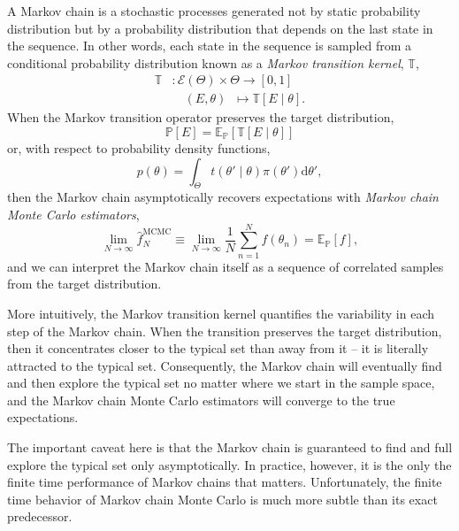 \documentclass[11pt, oneside]{article}
\newcommand{\dd}{ \mathrm{d} }
\newcommand{\PP}{ \mathbb{P} }
\newcommand{\EV}[1]{\ensuremath { \mathcal{E} \! \left( #1 \right)  } }
\begin{document}
A Markov chain is a stochastic processes generated not by 
static probability distribution but by a probability distribution 
that depends on the last state in the sequence.  In other words, 
each state in the sequence is sampled from a conditional 
probability distribution known as a \emph{Markov transition 
kernel}, $\mathbb{T}$, 
%
\begin{align*}
\mathbb{T}
&: \EV{\Theta} \times \Theta \rightarrow \left[0, 1 \right] \\
&\quad \left( E, \theta \right) \;\; \mapsto 
\mathbb{T} \! \left[ E \mid \theta \right].
\end{align*}
%
When the Markov transition operator preserves the target
distribution,
%
\begin{equation*}
\PP \! \left[ E \right]
=
\mathbb{E}_{\PP} \! 
\left[  \mathbb{T} \! \left[ E \mid \theta \right] \right]
\end{equation*}
%
or, with respect to probability density functions,
%
\begin{equation*}
p \! \left( \theta \right)
=
\int_{\Theta} t \! \left( \theta' \mid \theta \right) 
\pi \! \left( \theta' \right) \dd \theta',
\end{equation*}
%
then the Markov chain asymptotically recovers expectations
with \emph{Markov chain Monte Carlo estimators},
%
\begin{equation*}
\lim_{N \rightarrow \infty} 
\hat{f}^{\mathrm{MCMC}}_{N}
\equiv
\lim_{N \rightarrow \infty} 
\frac{1}{N} \sum_{n = 1}^{N} f \! \left( \theta_{n} \right)
=
\mathbb{E}_{\PP} \! \left[ f \right],
\end{equation*}
%
and we can interpret the Markov chain itself as a sequence
of correlated samples from the target distribution.

More intuitively, the Markov transition kernel quantifies
the variability in each step of the Markov chain.  When the
transition preserves the target distribution, then it 
concentrates closer to the typical set than away from it --
it is literally attracted to the typical set.  Consequently, the
Markov chain will eventually find and then explore the
typical set no matter where we start in the sample space,
and the Markov chain Monte Carlo estimators will converge
to the true expectations.
 
The important caveat here is that the Markov chain is 
guaranteed to find and full explore the typical set only 
asymptotically.  In practice, however, it is the only the finite time 
performance of Markov chains that matters.  Unfortunately, the 
finite time behavior of Markov chain Monte Carlo is much more
subtle than its exact predecessor.
\end{document}

